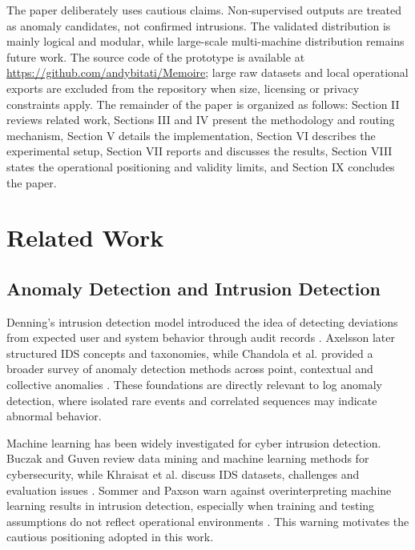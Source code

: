 \documentclass[conference]{IEEEtran}
\begin{document}
The paper deliberately uses cautious claims. Non-supervised outputs are treated as anomaly candidates, not confirmed intrusions. The validated distribution is mainly logical and modular, while large-scale multi-machine distribution remains future work. The source code of the prototype is available at \url{https://github.com/andybitati/Memoire}; large raw datasets and local operational exports are excluded from the repository when size, licensing or privacy constraints apply. The remainder of the paper is organized as follows: Section II reviews related work, Sections III and IV present the methodology and routing mechanism, Section V details the implementation, Section VI describes the experimental setup, Section VII reports and discusses the results, Section VIII states the operational positioning and validity limits, and Section IX concludes the paper.

\section{Related Work}
\subsection{Anomaly Detection and Intrusion Detection}
Denning's intrusion detection model introduced the idea of detecting deviations from expected user and system behavior through audit records \cite{denning1987intrusion}. Axelsson later structured IDS concepts and taxonomies, while Chandola et al. provided a broader survey of anomaly detection methods across point, contextual and collective anomalies \cite{axelsson2000intrusion,chandola2009anomaly}. These foundations are directly relevant to log anomaly detection, where isolated rare events and correlated sequences may indicate abnormal behavior.

Machine learning has been widely investigated for cyber intrusion detection. Buczak and Guven review data mining and machine learning methods for cybersecurity, while Khraisat et al. discuss IDS datasets, challenges and evaluation issues \cite{buczak2016survey,khraisat2019survey}. Sommer and Paxson warn against overinterpreting machine learning results in intrusion detection, especially when training and testing assumptions do not reflect operational environments \cite{sommer2010outside}. This warning motivates the cautious positioning adopted in this work.
\end{document}

